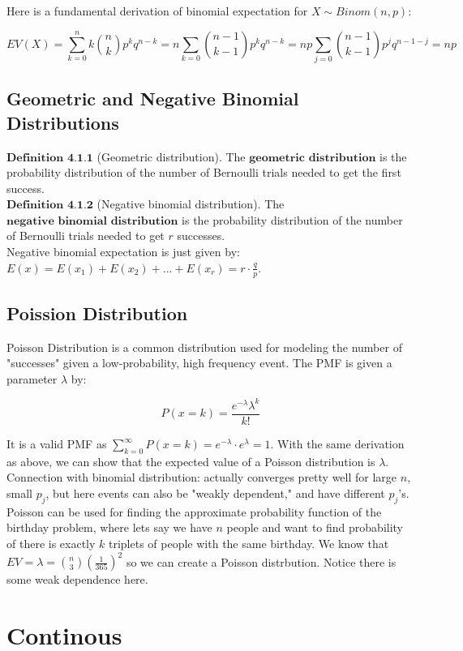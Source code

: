 \documentclass{article}
\begin{document}
    Here is a fundamental derivation of binomial expectation for $X \sim Binom(n,p)$:

    $$EV(X) = \sum_{k=0}^n k{n\choose k}p^kq^{n-k} = n\sum_{k=0} {n-1 \choose k-1}p^kq^{n-k} = np\sum_{j=0} {n-1 \choose k-1}p^{j}q^{n-1-j}=np$$

    \subsection*{Geometric and Negative Binomial Distributions}

    $\textbf{Definition 4.1.1}$ (Geometric distribution). The $\textbf{geometric distribution}$ is the probability distribution of the number of Bernoulli trials needed to get the first success.\\

    $\textbf{Definition 4.1.2}$ (Negative binomial distribution). The $\textbf{negative binomial distribution}$ is the probability distribution of the number of Bernoulli trials needed to get $r$ successes.\\
    
    Negative binomial expectation is just given by: $E(x) = E(x_1) + E(x_2) + ... + E(x_r) = r\cdot \frac{q}{p}$.\\

    \subsection*{Poission Distribution}

    Poisson Distribution is a common distribution used for modeling the number of "successes" given a low-probability, high frequency event. The PMF is given a parameter $\lambda$ by:

    $$P(x=k) = \frac{e^{-\lambda}\lambda^k}{k!}$$

    It is a valid PMF as $\sum_{k=0}^{\infty}P(x=k)=e^{-\lambda}\cdot e^\lambda=1$. With the same derivation as above, we can show that the expected value of a Poisson distribution is $\lambda$.\\

    Connection with binomial distribution: actually converges pretty well for large $n$, small $p_j$, but here events can also be "weakly dependent," and have different $p_j$'s.\\

    Poisson can be used for finding the approximate probability function of the birthday problem, where lets say  we have $n$ people and want to find probability of there is exactly $k$ triplets of people with the same birthday. We know that $EV=\lambda={n\choose 3}(\frac{1}{365})^2$ so we can create a Poisson distrbution. Notice there is some weak dependence here.\\

    \section{Continous}

    
\end{document}
